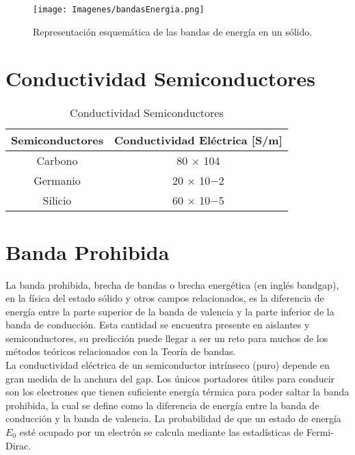 \documentclass{article}
\begin{document}

\begin{figure}
    \centering
    \texttt{[image: Imagenes/bandasEnergia.png]}
    \caption{Representación esquemática de las bandas de energía en un sólido.}
    \label{fig:bandasEnergia}
\end{figure}

\section{Conductividad Semiconductores}

\begin{table}[h!]
\centering

\begin{tabular}{|c|c|}
\hline
Semiconductores & Conductividad Eléctrica {[}S/m{]} \\ \hline
Carbono 	      & 80 × 104                          \\ \hline
Germanio 	     & 20 × 10−2                         \\ \hline
Silicio 	      & 60 × 10−5                         \\ \hline
\end{tabular}

\caption{Conductividad Semiconductores\citep{CondE}}
\label{tabla-conductividad-semiconductores}

\end{table}


\section{Banda Prohibida}

La banda prohibida, brecha de bandas o brecha energética (en inglés bandgap), en la física del estado sólido y otros campos relacionados, es la diferencia de energía entre la parte superior de la banda de valencia y la parte inferior de la banda de conducción. Esta cantidad se encuentra presente en aislantes y semiconductores, su predicción puede llegar a ser un reto para muchos de los métodos teóricos relacionados con la Teoría de bandas.\citep{BandaPBD}\\

La conductividad eléctrica de un semiconductor intrínseco (puro) depende en gran medida de la anchura del gap. Los únicos portadores útiles para conducir son los electrones que tienen suficiente energía térmica para poder saltar la banda prohibida, la cual se define como la diferencia de energía entre la banda de conducción y la banda de valencia. La probabilidad de que un estado de energía $E_0$ esté ocupado por un electrón se calcula mediante las estadísticas de Fermi-Dirac.\citep{BandaPBD}\\
\end{document}
